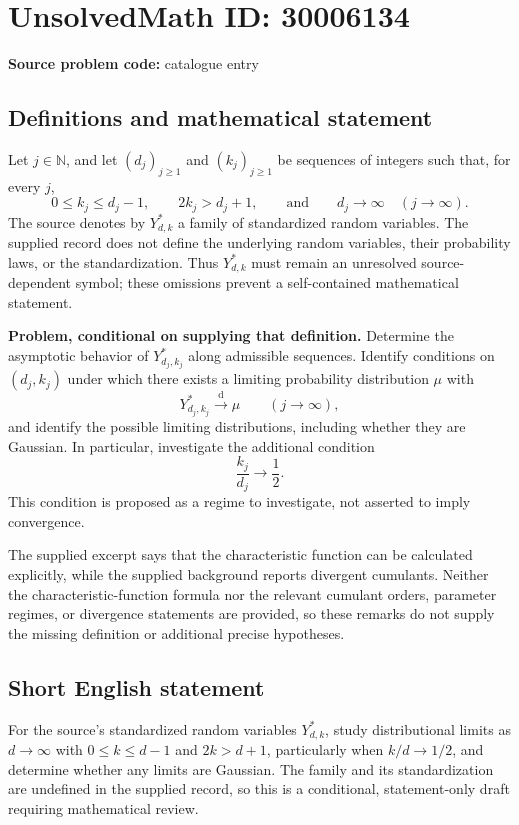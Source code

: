 \documentclass[11pt]{article}
\newcommand{\N}{\mathbb{N}}
\begin{document}
\section*{UnsolvedMath ID: 30006134}
\textbf{Source problem code:} catalogue entry
\subsection{Definitions and mathematical statement}
Let $j\in\N$, and let $(d_j)_{j\geq1}$ and $(k_j)_{j\geq1}$ be sequences of integers such that, for every $j$,
\[
0\leq k_j\leq d_j-1,\qquad 2k_j>d_j+1,
\qquad\text{and}\qquad d_j\longrightarrow\infty\quad(j\to\infty).
\]
The source denotes by $Y^*_{d,k}$ a family of standardized random variables. The supplied record does not define the underlying random variables, their probability laws, or the standardization. Thus $Y^*_{d,k}$ must remain an unresolved source-dependent symbol; these omissions prevent a self-contained mathematical statement.

\textbf{Problem, conditional on supplying that definition.} Determine the asymptotic behavior of $Y^*_{d_j,k_j}$ along admissible sequences. Identify conditions on $(d_j,k_j)$ under which there exists a limiting probability distribution $\mu$ with
\[
Y^*_{d_j,k_j}\xrightarrow{\mathrm{d}}\mu
\qquad(j\to\infty),
\]
and identify the possible limiting distributions, including whether they are Gaussian. In particular, investigate the additional condition
\[
\frac{k_j}{d_j}\longrightarrow\frac12.
\]
This condition is proposed as a regime to investigate, not asserted to imply convergence.

The supplied excerpt says that the characteristic function can be calculated explicitly, while the supplied background reports divergent cumulants. Neither the characteristic-function formula nor the relevant cumulant orders, parameter regimes, or divergence statements are provided, so these remarks do not supply the missing definition or additional precise hypotheses.
\subsection{Short English statement}
For the source's standardized random variables $Y^*_{d,k}$, study distributional limits as $d\to\infty$ with $0\leq k\leq d-1$ and $2k>d+1$, particularly when $k/d\to1/2$, and determine whether any limits are Gaussian. The family and its standardization are undefined in the supplied record, so this is a conditional, statement-only draft requiring mathematical review.
\end{document}
